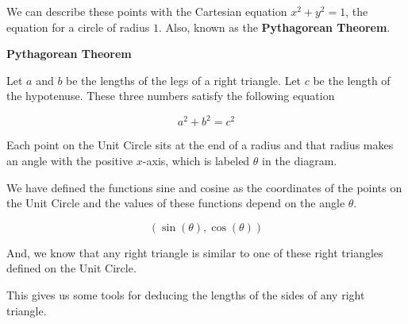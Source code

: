 \documentclass{ximera}
\begin{document}
We can describe these points with the Cartesian equation $x^2 + y^2 = 1$, the equation for a circle of radius $1$. Also, known as the \textbf{Pythagorean Theorem}.



\begin{theorem}   \textbf{\textcolor{-red!75!green}{Pythagorean Theorem}} 

Let $a$ and $b$ be the lengths of the legs of a right triangle. Let $c$ be the length of the hypotenuse. These three numbers satisfy the following equation

\[
a^2 + b^2 = c^2
\]

\end{theorem}




Each point on the Unit Circle sits at the end of a radius and that radius makes an angle with the positive $x$-axis, which is labeled $\theta$ in the diagram.




We have defined the functions sine and cosine as the coordinates of the points on the Unit Circle and the values of these functions depend on the angle $\theta$.

\[    ( \sin(\theta), \cos(\theta) ) \]




And, we know that any right triangle is similar to one of these right triangles defined on the Unit Circle.


This gives us some tools for deducing the lengths of the sides of any right triangle.
\end{document}
